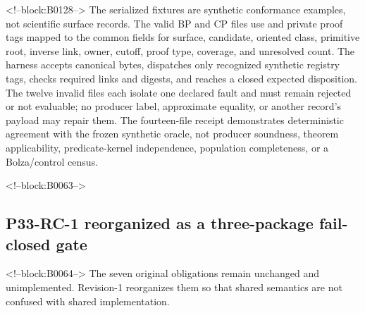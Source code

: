 \documentclass[11pt,a4paper]{article}
\begin{document}
<!--block:B0128-->
The serialized fixtures are synthetic conformance examples, not scientific surface records. The valid BP and CP files use  and private proof tags mapped to the common fields for surface, candidate, oriented class, primitive root, inverse link, owner, cutoff, proof type, coverage, and unresolved count. The harness accepts canonical bytes, dispatches only recognized synthetic registry tags, checks required links and digests, and reaches a closed expected disposition. The twelve invalid files each isolate one declared fault and must remain rejected or not evaluable; no producer label, approximate equality, or another record's payload may repair them. The fourteen-file receipt demonstrates deterministic agreement with the frozen synthetic oracle, not producer soundness, theorem applicability, predicate-kernel independence, population completeness, or a Bolza/control census.

<!--block:B0063-->
\hypertarget{p33-rc-1-reorganized-as-a-three-package-fail-closed-gate}{%
\subsection{P33-RC-1 reorganized as a three-package fail-closed gate}\label{p33-rc-1-reorganized-as-a-three-package-fail-closed-gate}}

<!--block:B0064-->
The seven original obligations remain unchanged and unimplemented. Revision-1 reorganizes them so that shared semantics are not confused with shared implementation.
\end{document}
